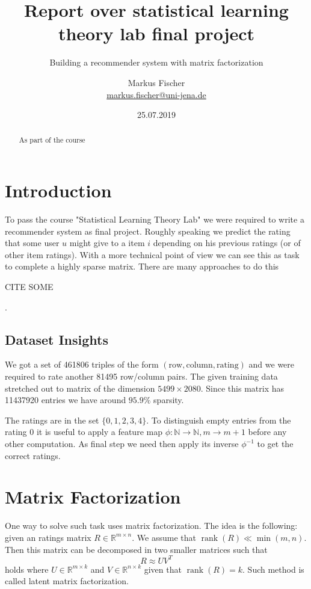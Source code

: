 \documentclass[DIV=14,twocolumn]{scrartcl}
\title{Report over statistical learning theory lab final project}
\subtitle{Building a recommender system with matrix factorization}
\author{Markus Fischer\\ \small{\href{mailto:markus.fischer@uni-jena.de}{markus.fischer@uni-jena.de}}}
\date{25.07.2019}
\DeclareMathOperator{\rank}{rank}
\begin{document}
\maketitle
\begin{abstract}
As part of the course 
\end{abstract}

\section{Introduction}
To pass the course "Statistical Learning Theory Lab" we were required to write a recommender system as final project. Roughly speaking we predict the rating that some user $u$ might give to a item $i$ depending on his previous ratings (or of other item ratings). 
With a more technical point of view we can see this as task to complete a highly sparse matrix. There are many approaches to do this \begin{LARGE}CITE SOME\end{LARGE}. 

\subsection{Dataset Insights}
We got a set of 461806 triples of the form $(\text{row},\text{column},\text{rating})$ and we were required to rate another 81495 row/column pairs. 
The given training data stretched out to matrix of the dimension $5499\times 2080$. Since this matrix has 11437920 entries we have around $95.9\%$ sparsity.

The ratings are in the set $\{0,1,2,3,4\}$. To distinguish empty entries from the rating 0 it is useful to apply a feature map $\phi:\mathbb{N}\rightarrow\mathbb{N},m\rightarrow m+1$ before any other computation. As final step we need then apply its inverse $\phi^{-1}$ to get the correct ratings.  


\section{Matrix Factorization}
One way to solve such task uses matrix factorization. The idea is the following: given an ratings matrix $R\in\mathbb{R}^{m\times n}$. We assume that $\rank(R)\ll\min(m,n)$. Then this matrix can be decomposed in two smaller matrices such that 
$$R\approx UV^T$$ holds where $U\in\mathbb{R}^{m\times k}$ and $V\in\mathbb{R}^{n\times k}$ given that $\rank(R)=k$. Such method is called latent matrix factorization.
\end{document}
